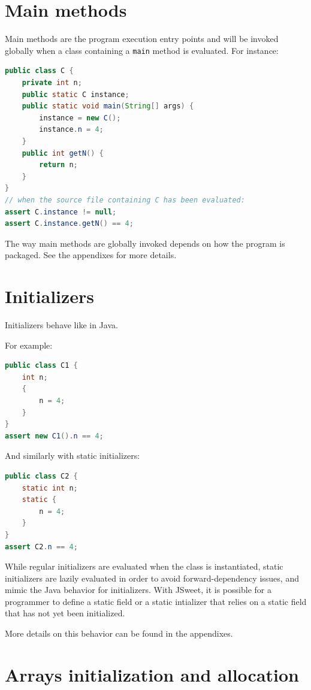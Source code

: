 \documentclass[a4paper]{report}
\begin{document}
\section{Main methods}

Main methods are the program execution entry points and will be invoked globally when a class containing a \texttt{main} method is evaluated. For instance:

\begin{lstlisting}[language=Java]
public class C {
	private int n;
	public static C instance;
	public static void main(String[] args) {
		instance = new C();
		instance.n = 4;
	}
	public int getN() {
		return n;
	}
}
// when the source file containing C has been evaluated:
assert C.instance != null;
assert C.instance.getN() == 4;
\end{lstlisting}

The way main methods are globally invoked depends on how the program is packaged. See the appendixes for more details.

\section{Initializers}

Initializers behave like in Java.

\noindent
For example:

\begin{lstlisting}[language=Java]
public class C1 {
	int n;
	{
		n = 4;
	}
}
assert new C1().n == 4;
\end{lstlisting}

\noindent
And similarly with static initializers:

\begin{lstlisting}[language=Java]
public class C2 {
	static int n;
	static {
		n = 4;
	}
}
assert C2.n == 4;
\end{lstlisting}

While regular initializers are evaluated when the class is instantiated, static initializers are lazily evaluated in order to avoid forward-dependency issues, and mimic the Java behavior for initializers. With JSweet, it is possible for a programmer to define a static field or a static intializer that relies on a static field that has not yet been initialized.

More details on this behavior can be found in the appendixes.

\section{Arrays initialization and allocation}
\end{document}
